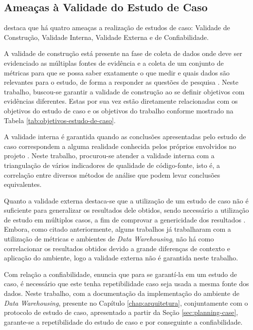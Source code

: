 \subsection{Ameaças à Validade do Estudo de Caso}
\label{sec:validade-estudo}

 destaca que há quatro ameaças a realização de estudos de caso: Validade de Construção, Validade Interna, Validade Externa e de Confiabilidade.

A validade de construção está presente na fase de coleta de dados onde deve ser evidenciado as múltiplas fontes de evidência e a coleta de um conjunto de métricas para que se possa saber exatamente o que medir e quais dados são relevantes para o estudo, de forma a responder as questões de pesquisa \cite{yin2011applications}. Neste trabalho, buscou-se garantir a validade de construção ao se definir objetivos com evidências diferentes. Estas por sua vez estão diretamente relacionadas com os objetivos do estudo de caso e os objetivos do trabalho conforme mostrado na Tabela \ref{tab:objetivos-estudo-de-caso}.

A validade interna é garantida quando as conclusões apresentadas pelo estudo de caso correspondem a alguma realidade conhecida pelos próprios envolvidos no projeto \cite{yin2011applications}. Neste trabalho, procurou-se atender a validade interna com a triangulação de vários indicadores de qualidade de código-fonte, isto é, a correlação entre diversos métodos de análise que podem levar conclusões equivalentes. 

Quanto a validade externa destaca-se que a utilização de um estudo de caso não é suficiente para generalizar os resultados dele obtidos, sendo necessário a utilização de estudo em múltiplos casos, a fim de comprovar a genericidade dos resultados \cite{yin2011applications}. Embora, como citado anteriormente, alguns trabalhos já trabalharam com a utilização de métricas e ambientes de \textit{Data Warehousing}, não há como correlacionar os resultados obtidos devido a grande diferenças de contexto e aplicação do ambiente, logo a validade externa não é garantida neste trabalho.

Com relação a confiabilidade,  enuncia que para se garantí-la em um estudo de caso, é necessário que este tenha repetibilidade caso seja usada a mesma fonte dos dados. Neste trabalho, com a documentação da implementação do ambiente de \textit{Data Warehousing}, presente no Capítulo \ref{chap:arquitetura}, conjuntamente com o protocolo de estudo de caso, apresentado a partir da Seção \ref{sec:planning-case}, garante-se a repetibilidade do estudo de caso e por conseguinte a confiabilidade.

